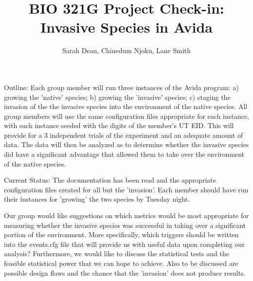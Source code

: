 \documentclass[10pt]{article}
\begin{document}
\title{BIO 321G Project Check-in: Invasive Species in Avida}
\author{Sarah Dean, Chinedum Njoku, Lane Smith}
\maketitle
Outline: Each group member will run three instances of the Avida program: a)
growing the 'native' species; b) growing the 'invasive' species; c) staging the
invasion of the the invasive species into the environment of the native
species. All group members will use the same configuration files appropriate
for each instance, with each instance seeded with the digits of the member's UT
EID. This will provide for a 3 independent trials of the experiment and an
adequate amount of data. The data will then be analyzed as to determine whether
the invasive species did have a significant advantage that allowed them to take
over the environment of the native species.

Current Status: The documentation has been read and the appropriate
configuration files created for all but the 'invasion'. Each member should have
run their instances for 'growing' the two species by Tuesday night. 

Our group would like suggestions on which metrics would be most appropriate for
measuring whether the invasive species was successful in taking over a
significant portion of the environment. More specifically, which triggers
should be written into the events.cfg file that will provide us with useful
data upon completing our analysis? Furthermore, we would like to discuss the
statistical tests and the feasible statistical power that we can hope to
achieve. Also to be discussed are possible design flaws and the chance that the
'invasion' does not produce results. 
\end{document}
